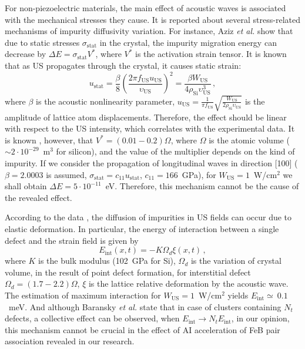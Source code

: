 \documentclass[%
 aip,jap,
 amsmath,amssymb,
 reprint,%
]{revtex4-1}
\begin{document}
For non-piezoelectric materials,
the main effect of acoustic waves is associated with the mechanical stresses they cause.
It is reported \cite{AZIZ2001,AzizPhysRev,FeStrain,MirzadeJAP2011,MirzadeJAP2008,PeleshchakUJF2016,Pavlovich,Krevchik} about several stress-related mechanisms of impurity diffusivity variation.
For instance, Aziz \emph{et al.} \cite{AZIZ2001,AzizPhysRev} show that due to static stresses
$\sigma_\mathrm{stat}$ in the crystal,
the impurity migration energy can decrease by
$\Delta E=\sigma_\mathrm{stat}V^\ast$,
where $V^\ast$ is the activation strain tensor.
It is known\cite{Yost} that as US propagates through the crystal,
it causes static strain:
\begin{equation}
\label{eqUstat}
u_\mathrm{stat}=\frac{\beta}{8}\left(\frac{2\pi f_\mathrm{US}u_\mathrm{US}}{\upsilon_\mathrm{US}}\right)^2
=\frac{\beta W_\mathrm{US}}{4\rho_\mathrm{Si}\upsilon_\mathrm{US}^3}\,,
\end{equation}
where
$\beta$ is the acoustic nonlinearity parameter,
$u_\mathrm{US}=\frac{1}{\pi f_\mathrm{US}}\sqrt{\frac{W_\mathrm{US}}{2\rho_\mathrm{Si}\upsilon_\mathrm{US}}}$
is the amplitude of lattice atom displacements.
Therefore, the effect should be linear with respect to the US intensity, which correlates with the experimental data.
It is known \cite{AzizPhysRev,Chen2006}, however, that $V^\ast=(0.01-0.2)\Omega$,
where
$\Omega$ is the atomic volume ($\sim2\cdot10^{-29}$~m$^3$ for silicon),
and the value of the multiplier depends on the kind of impurity.
If we consider the propagation of longitudinal waves in direction [100]
($\beta=2.0003$ is assumed\cite{NelinSi}, $\sigma_\mathrm{stat}=c_{11} u_\mathrm{stat}$,
$c_{11}=166$~GPa),
for $W_\mathrm{US}=1$~W/cm$^2$  we shall obtain $\Delta E=5\cdot10^{-11}$~eV.
Therefore, this mechanism cannot be the cause of the revealed effect.

According to the data \cite{MirzadeJAP2011,MirzadeJAP2008,PeleshchakUJF2016}, the diffusion of impurities in US fields can occur due to elastic deformation.
In particular, the energy of interaction between a single defect and the strain field is given by
\begin{equation}
\label{eqEint}
E_\mathrm{int}(x,t)=-K\Omega_d\xi(x,t)\,,
\end{equation}
where $K$ is the bulk modulus (102~GPa for Si),
$\Omega_d$ is the variation of crystal volume, in the result of point defect formation,
for interstitial defect \cite{MirzadeJAP2008} $\Omega_d=(1.7-2.2)\Omega$,
$\xi$ is the lattice relative deformation by the acoustic wave.
The estimation of maximum interaction for
$W_\mathrm{US}=1$~W/cm$^2$ yields $E_\mathrm{int}\simeq~0.1$~meV.
And although Baransky \emph{et al.} \cite{BaranskyPSS} state that in case of clusters containing $N_t$ defects, a collective effect can be observed, when $E_\mathrm{int}\rightarrow N_t E_\mathrm{int}$,
in our opinion, this mechanism cannot be crucial in the effect of AI acceleration of  FeB pair association revealed in our research.
\end{document}
